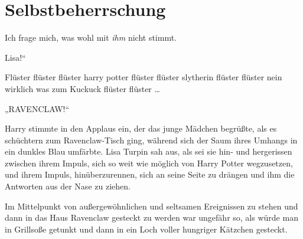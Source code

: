 \chapter{Selbstbeherrschung}

\begin{chapterOpeningQuote}
Ich frage mich, was wohl mit \emph{ihm} nicht stimmt.
\end{chapterOpeningQuote}

 Lisa!“

\hplettrineextrapara
Flüster flüster flüster harry potter flüster flüster slytherin flüster flüster nein wirklich was zum Kuckuck flüster flüster …

„RAVENCLAW!“

Harry stimmte in den Applaus ein, der das junge Mädchen begrüßte, als es schüchtern zum Ravenclaw-Tisch ging, während sich der Saum ihres Umhangs in ein dunkles Blau umfärbte. Lisa Turpin sah aus, als sei sie hin- und hergerissen zwischen ihrem Impuls, sich so weit wie möglich von Harry Potter wegzusetzen, und ihrem Impuls, hinüberzurennen, sich an seine Seite zu drängen und ihm die Antworten aus der Nase zu ziehen.

Im Mittelpunkt von außergewöhnlichen und seltsamen Ereignissen zu stehen und dann in das Haus Ravenclaw gesteckt zu werden war ungefähr so, als würde man in Grillsoße getunkt und dann in ein Loch voller hungriger Kätzchen gesteckt.

